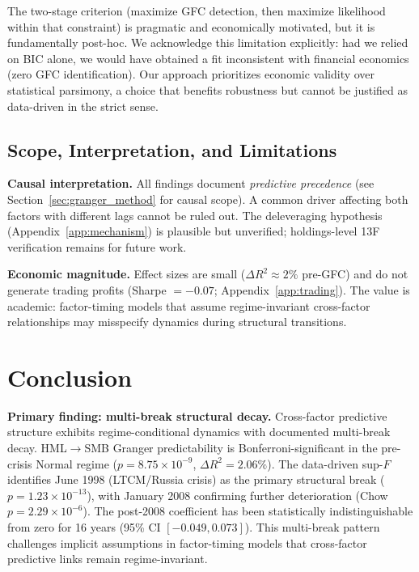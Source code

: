 \documentclass[sigconf,anonymous]{acmart}
\begin{document}
The two-stage criterion (maximize GFC detection, then maximize likelihood within that constraint)
is pragmatic and economically motivated, but it is fundamentally post-hoc. We acknowledge this
limitation explicitly: had we relied on BIC alone, we would have obtained a fit inconsistent
with financial economics (zero GFC identification). Our approach prioritizes economic validity
over statistical parsimony, a choice that benefits robustness but cannot be justified as data-driven
in the strict sense.


\subsection{Scope, Interpretation, and Limitations}
\label{sec:limitations}

\textbf{Causal interpretation.}
All findings document \emph{predictive precedence} (see Section~\ref{sec:granger_method} for causal scope).
A common driver affecting both factors with different lags cannot be ruled out.
The deleveraging hypothesis (Appendix~\ref{app:mechanism}) is plausible but
unverified; holdings-level 13F verification remains for future work.

\textbf{Economic magnitude.}
Effect sizes are small ($\Delta R^2 \approx 2\%$ pre-GFC) and do not generate
trading profits (Sharpe $= -0.07$; Appendix~\ref{app:trading}). The value is
academic: factor-timing models that assume regime-invariant cross-factor
relationships may misspecify dynamics during structural transitions.

\section{Conclusion}

\textbf{Primary finding: multi-break structural decay.}
Cross-factor predictive structure exhibits regime-conditional dynamics with documented
multi-break decay. HML$\to$SMB Granger predictability is Bonferroni-significant in the
pre-crisis Normal regime ($p = 8.75 \times 10^{-9}$, $\Delta R^2 = 2.06\%$).
The data-driven sup-$F$ identifies June 1998 (LTCM/Russia crisis) as the primary
structural break ($p = 1.23\times10^{-13}$), with January 2008 confirming further
deterioration (Chow $p = 2.29\times10^{-6}$). The post-2008 coefficient has been
statistically indistinguishable from zero for 16 years (95\% CI $[-0.049, 0.073]$).
This multi-break pattern challenges implicit assumptions in factor-timing models
that cross-factor predictive links remain regime-invariant.
\end{document}
